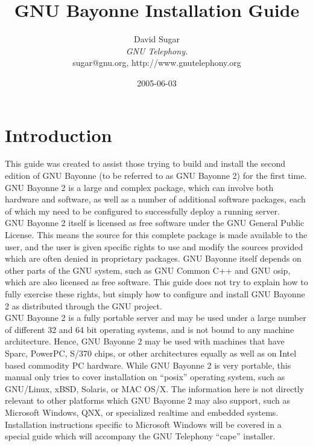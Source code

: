 \documentclass[a4paper,12pt]{article}
\date{2005-06-03}
\title{GNU Bayonne Installation Guide}
\author{
David Sugar \\
{\em GNU Telephony.}\\
{\normalsize sugar@gnu.org, http://www.gnutelephony.org} \\
}
\begin{document}
\renewcommand{\thepage}{}

\maketitle

\tableofcontents

\section{Introduction}

This guide was created to assist those trying to build and install the
second edition of GNU Bayonne (to be referred to as GNU Bayonne 2) for
the first time.  GNU Bayonne 2 is a large and complex package, which can
involve both hardware and software, as well as a number of additional
software packages, each of which my need to be configured to
successfully deploy a running server. \\

GNU Bayonne 2 itself is licensed as free software under the GNU General
Public License.  This means the source for this complete package is made
available to the user, and the user is given specific rights to use and
modify the sources provided which are often denied in proprietary
packages.  GNU Bayonne itself depends on other parts of the GNU system,
such as GNU Common C++ and GNU osip, which are also licensed as free
software.  This guide does not try to explain how to fully exercise
these rights, but simply how to configure and install GNU Bayonne 2 as
distributed through the GNU project. \\

GNU Bayonne 2 is a fully portable server and may be used under a large
number of different 32 and 64 bit operating systems, and is not bound to
any machine architecture.  Hence, GNU Bayonne 2 may be used with
machines that have Sparc, PowerPC, S/370 chips, or other architectures
equally as well as on Intel based commodity PC hardware.  While GNU
Bayonne 2 is very portable, this manual only tries to cover installation
on ``posix'' operating system, such as GNU/Linux, xBSD, Solaris, or MAC
OS/X.  The information here is not directly relevant to other platforms
which GNU Bayonne 2 may also support, such as Microsoft Windows, QNX, or
specialized realtime and embedded systems.  Installation instructions
specific to Microsoft Windows will be covered in a special guide which
will accompany the GNU Telephony ``cape'' installer. \\
\end{document}
